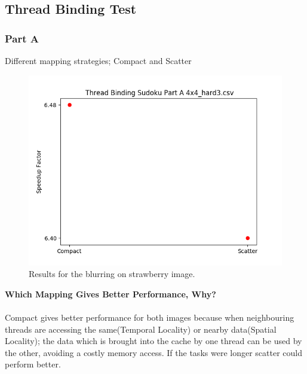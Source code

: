 \documentclass{article}
\newcommand\tab[1][0.5cm]{\hspace*{#1}}
\begin{document}
\subsection{Thread Binding Test}
\subsubsection{Part A}
\begin{description}
    \item[Different mapping strategies; Compact and Scatter]
\end{description}
\begin{figure}[!htb]
    \centering
    \includegraphics[width=1\linewidth]{./img/binding_part_2_A.png}
    \caption{Results for the blurring on strawberry image.}
\end{figure}
\textbf{Which Mapping Gives Better Performance, Why?}\\
\\ \tab Compact gives better performance for both images because 
when neighbouring threads are accessing the same(Temporal Locality) or nearby data(Spatial Locality);
the data which is brought into the cache by one thread can be used 
by the other, avoiding a costly memory access.
If the tasks were longer scatter could perform better. 


\newpage
\end{document}
